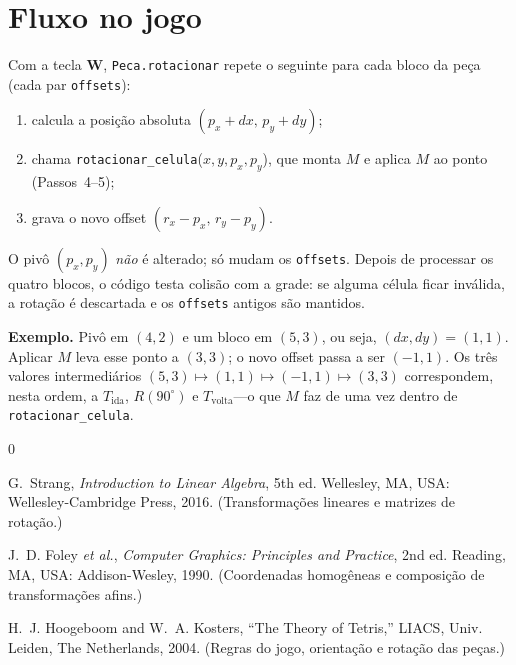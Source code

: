 \documentclass[conference,onecolumn]{IEEEtran}
\begin{document}
\section{Fluxo no jogo}

Com a tecla \textbf{W}, \texttt{Peca.rotacionar} repete o seguinte para cada bloco da peça (cada par \texttt{offsets}):
\begin{enumerate}
\item calcula a posição absoluta $(p_x{+}dx,\,p_y{+}dy)$;
\item chama \texttt{rotacionar\_celula}($x,y,p_x,p_y$), que monta $M$ e aplica $M$ ao ponto (Passos~4--5);
\item grava o novo offset $(r_x{-}p_x,\,r_y{-}p_y)$.
\end{enumerate}
O pivô $(p_x,p_y)$ \emph{não} é alterado; só mudam os \texttt{offsets}. Depois de processar os quatro blocos, o código testa colisão com a grade: se alguma célula ficar inválida, a rotação é descartada e os \texttt{offsets} antigos são mantidos.

\textbf{Exemplo.} Pivô em $(4,2)$ e um bloco em $(5,3)$, ou seja, $(dx,dy){=}(1,1)$. Aplicar $M$ leva esse ponto a $(3,3)$; o novo offset passa a ser $(-1,1)$. Os três valores intermediários $(5,3){\mapsto}(1,1){\mapsto}(-1,1){\mapsto}(3,3)$ correspondem, nesta ordem, a $T_{\text{ida}}$, $R(90^\circ)$ e $T_{\text{volta}}$---o que $M$ faz de uma vez dentro de \texttt{rotacionar\_celula}.

\begin{thebibliography}{0}

G.~Strang, \textit{Introduction to Linear Algebra}, 5th ed. Wellesley, MA, USA: Wellesley-Cambridge Press, 2016. (Transformações lineares e matrizes de rotação.)

J.~D. Foley \textit{et al.}, \textit{Computer Graphics: Principles and Practice}, 2nd ed. Reading, MA, USA: Addison-Wesley, 1990. (Coordenadas homogêneas e composição de transformações afins.)

H.~J. Hoogeboom and W.~A. Kosters, ``The Theory of Tetris,'' LIACS, Univ. Leiden, The Netherlands, 2004. (Regras do jogo, orientação e rotação das peças.)

\end{thebibliography}
\end{document}
